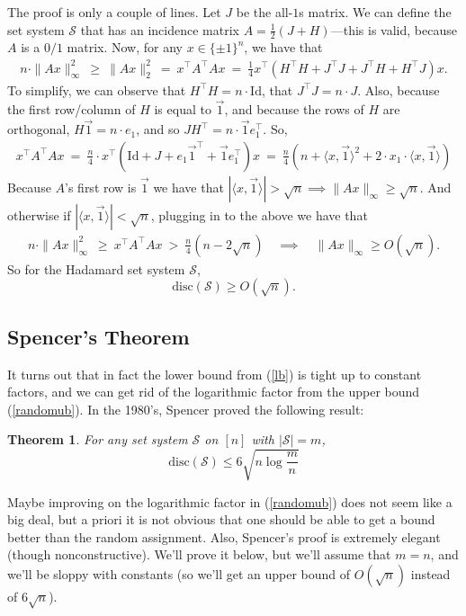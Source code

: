 \documentclass{article}
\theoremstyle{theorem}
\newtheorem{theorem}{Theorem}
\theoremstyle{definition}
\newcommand{\disc}{\mathrm{disc}}
\newcommand{\iprod}[1]{\langle #1 \rangle}
\newcommand{\cS}{\mathcal{S}}
\newcommand{\Id}{\mathrm{Id}}
\begin{document}
The proof is only a couple of lines.
Let $J$ be the all-$1$s matrix.
We can define the set system $\cS$ that has an incidence matrix $A = \frac{1}{2}(J+H)$---this is valid, because $A$ is a $0/1$ matrix.
Now, for any $x \in \{\pm 1\}^n$, we have that
\begin{align*}
    n \cdot \|Ax\|_{\infty}^2
    ~\ge~\|Ax\|_2^2
    ~=~ x^{\top}A^{\top} A x
    ~=~\frac{1}{4} x^{\top} \left(H^{\top} H + J^{\top} J + J^{\top} H + H^{\top} J\right)x.
\end{align*}
To simplify, we can observe that $H^{\top}H = n\cdot \Id$, that $J^{\top} J = n\cdot J$.
Also, because the first row/column of $H$ is equal to $\vec{1}$, and because the rows of $H$ are orthogonal, $H\vec{1} = n \cdot e_1$, and so $JH^{\top} = n \cdot \vec{1}e_1^{\top}$.
So,
\begin{align*}
    x^{\top} A^{\top}Ax
    ~=~ \frac{n}{4} \cdot x^{\top}\left( \Id +  J + e_1 \vec{1}^{\top} + \vec{1}e_1^{\top}\right) x
    ~=~ \frac{n}{4}\left(n + \iprod{x,\vec{1}}^2 + 2\cdot x_1 \cdot \iprod{x,\vec{1}}\right)
\end{align*}
Because $A$'s first row is $\vec{1}$ we have that $|\iprod{x,\vec{1}}| > \sqrt{n} \implies \|Ax\|_{\infty} \ge \sqrt{n}$.
And otherwise if $|\iprod{x,\vec{1}}| < \sqrt{n}$, plugging in to the above we have that
\begin{align*}
    n\cdot \|Ax\|_{\infty}^2
    ~\ge~  x^{\top} A^{\top} A x
    ~>~ \frac{n}{4}\left(n  - 2\sqrt{n}\right)
    \quad \implies \quad
    \|Ax\|_{\infty} \ge  O(\sqrt{n}).
\end{align*}
So for the Hadamard set system $\cS$,
\begin{equation}
    \disc(\cS) \ge O(\sqrt{n}).\label{lb}
\end{equation}

\subsection*{Spencer's Theorem}

It turns out that in fact the lower bound from (\ref{lb}) is tight up to constant factors, and we can get rid of the logarithmic factor from the upper bound (\ref{randomub}).
In the 1980's, Spencer proved the following result:
\begin{theorem}
    For any set system $\cS$ on $[n]$ with $|\cS| = m$,
    \[
	\disc(\cS) \le 6\sqrt{n\log\frac{m}{n}}
    \]
\end{theorem}
Maybe improving on the logarithmic factor in (\ref{randomub}) does not seem like a big deal, but a priori it is not obvious that one should be able to get a bound better than the random assignment.
Also, Spencer's proof is extremely elegant (though nonconstructive).
We'll prove it below, but we'll assume that $m = n$, and we'll be sloppy with constants (so we'll get an upper bound of $O(\sqrt{n})$ instead of $6\sqrt{n}$).
\end{document}
